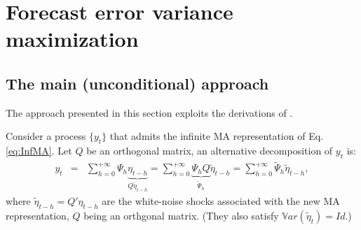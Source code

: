 \documentclass[
  12pt,
]{book}
\newenvironment{Shaded}{\begin{snugshade}}{\end{snugshade}}
\newcommand{\CommentTok}[1]{\textcolor[rgb]{0.56,0.35,0.01}{\textit{#1}}}
\newcommand{\NormalTok}[1]{#1}
\newcommand{\OtherTok}[1]{\textcolor[rgb]{0.56,0.35,0.01}{#1}}
\newcommand{\SpecialCharTok}[1]{\textcolor[rgb]{0.81,0.36,0.00}{\textbf{#1}}}
\theoremstyle{definition}
\theoremstyle{definition}
\theoremstyle{definition}
\theoremstyle{definition}
\theoremstyle{remark}
\begin{document}
\begin{Shaded}
\end{Shaded}

\chapter{Forecast error variance maximization}\label{forecast-error-variance-maximization}

\section{The main (unconditional) approach}\label{the-main-unconditional-approach}

The approach presented in this section exploits the derivations of \citet{Uhlig_2004}.

Consider a process \(\{y_t\}\) that admits the infinite MA representation of Eq. \eqref{eq:InfMA}. Let \(Q\) be an orthogonal matrix, an alternative decomposition of \(y_t\) is:
\begin{eqnarray}
y_t&=&\sum_{h=0}^{+\infty}\Psi_h\underbrace{\eta_{t-h}}_{Q\tilde \eta_{t-h}} = \sum_{h=0}^{+\infty}\underbrace{\Psi_hQ}_{\tilde\Psi_h}\tilde
\eta_{t-h} = \sum_{h=0}^{+\infty}\tilde\Psi_h\tilde \eta_{t-h},
\end{eqnarray}
where \(\tilde \eta_{t-h}=Q'\eta_{t-h}\) are the white-noise shocks associated with the new MA representation, \(Q\) being an orthgonal matrix. (They also satisfy \(\mathbb{V}ar(\tilde\eta_t)=Id\).)
\end{document}
